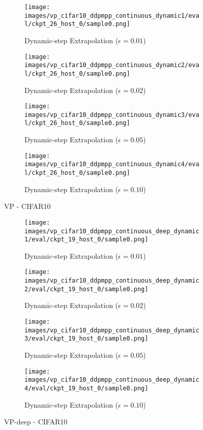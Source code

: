 \documentclass{article}
\begin{document}
\begin{figure}[ht] 
  \begin{subfigure}[b]{0.5\linewidth}
    \centering
    \texttt{[image: images/vp\_cifar10\_ddpmpp\_continuous\_dynamic1/eval/ckpt\_26\_host\_0/sample0.png]} 
    \caption{Dynamic-step Extrapolation ($\epsilon=0.01$)} 
  \end{subfigure}
  \begin{subfigure}[b]{0.5\linewidth}
    \centering
    \texttt{[image: images/vp\_cifar10\_ddpmpp\_continuous\_dynamic2/eval/ckpt\_26\_host\_0/sample0.png]}
    \caption{Dynamic-step Extrapolation ($\epsilon=0.02$)} 
  \end{subfigure}
  \begin{subfigure}[b]{0.5\linewidth}
    \centering
    \texttt{[image: images/vp\_cifar10\_ddpmpp\_continuous\_dynamic3/eval/ckpt\_26\_host\_0/sample0.png]} 
    \caption{Dynamic-step Extrapolation ($\epsilon=0.05$)} 
  \end{subfigure}
  \begin{subfigure}[b]{0.5\linewidth}
    \centering
    \texttt{[image: images/vp\_cifar10\_ddpmpp\_continuous\_dynamic4/eval/ckpt\_26\_host\_0/sample0.png]}
    \caption{Dynamic-step Extrapolation ($\epsilon=0.10$)} 
  \end{subfigure}
  \caption{VP - CIFAR10}
  \label{fig11} 
\end{figure}


\begin{figure}[ht] 
  \begin{subfigure}[b]{0.5\linewidth}
    \centering
    \texttt{[image: images/vp\_cifar10\_ddpmpp\_continuous\_deep\_dynamic1/eval/ckpt\_19\_host\_0/sample0.png]} 
    \caption{Dynamic-step Extrapolation ($\epsilon=0.01$)} 
  \end{subfigure}
  \begin{subfigure}[b]{0.5\linewidth}
    \centering
    \texttt{[image: images/vp\_cifar10\_ddpmpp\_continuous\_deep\_dynamic2/eval/ckpt\_19\_host\_0/sample0.png]}
    \caption{Dynamic-step Extrapolation ($\epsilon=0.02$)} 
  \end{subfigure}
  \begin{subfigure}[b]{0.5\linewidth}
    \centering
    \texttt{[image: images/vp\_cifar10\_ddpmpp\_continuous\_deep\_dynamic3/eval/ckpt\_19\_host\_0/sample0.png]} 
    \caption{Dynamic-step Extrapolation ($\epsilon=0.05$)} 
  \end{subfigure}
  \begin{subfigure}[b]{0.5\linewidth}
    \centering
    \texttt{[image: images/vp\_cifar10\_ddpmpp\_continuous\_deep\_dynamic4/eval/ckpt\_19\_host\_0/sample0.png]}
    \caption{Dynamic-step Extrapolation ($\epsilon=0.10$)} 
  \end{subfigure}
  \caption{VP-deep - CIFAR10}
  \label{fig12} 
\end{figure}
\end{document}
